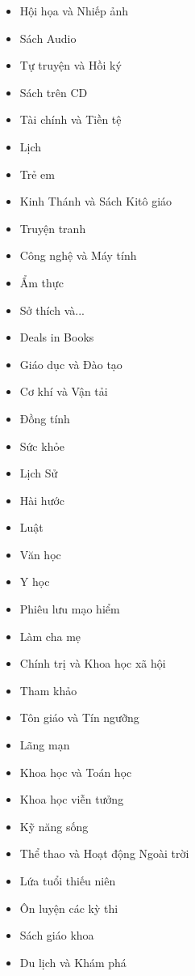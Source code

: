 \documentclass[12pt,a4paper]{report}
\begin{document}
            \begin{itemize}
                \item Hội họa và Nhiếp ảnh
                \item Sách Audio
                \item Tự truyện và Hồi ký
                \item Sách trên CD
                \item Tài chính và Tiền tệ
                \item Lịch
                \item Trẻ em
                \item Kinh Thánh và Sách Kitô giáo
                \item Truyện tranh
                \item Công nghệ và Máy tính
                \item Ẩm thực
                \item Sở thích và...
                \item Deals in Books
                \item Giáo dục và Đào tạo
                \item Cơ khí và Vận tải
                \item Đồng tính
                \item Sức khỏe
                \item Lịch Sử
                \item Hài hước
                \item Luật
                \item Văn học
                \item Y học
                \item Phiêu lưu mạo hiểm
                \item Làm cha mẹ
                \item Chính trị và Khoa học xã hội
                \item Tham khảo
                \item Tôn giáo và Tín ngưỡng
                \item Lãng mạn
                \item Khoa học và Toán học
                \item Khoa học viễn tưởng
                \item Kỹ năng sống
                \item Thể thao và Hoạt động Ngoài trời
                \item Lứa tuổi thiếu niên
                \item Ôn luyện các kỳ thi
                \item Sách giáo khoa
                \item Du lịch và Khám phá
            \end{itemize}
\end{document}
